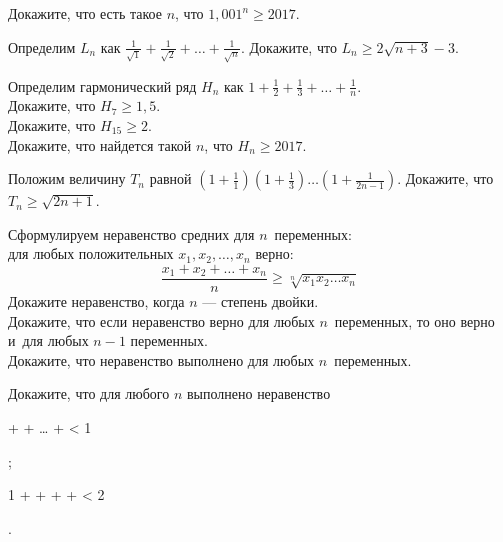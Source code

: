 



\begin{problems}

\item
Докажите, что есть такое $n$, что $1{,}001^{n} \geq 2017$.

\item
Определим $L_{n}$ как 
\(
    \frac{1}{\sqrt{1}} + \frac{1}{\sqrt{2}} + \ldots + \frac{1}{\sqrt{n}}
\).
Докажите, что $L_{n} \geq 2 \sqrt{n + 3} - 3$. 

\item
Определим гармонический ряд $H_{n}$ как 
\(
    1 + \frac{1}{2} + \frac{1}{3} + \ldots + \frac{1}{n}
\).
\\
\subproblem
Докажите, что $H_{7} \geq 1{,}5$.
\\
\subproblem
Докажите, что $H_{15} \geq 2$.
\\
\subproblem
Докажите, что найдется такой $n$, что $H_{n} \geq 2017$.

\item
Положим величину $T_{n}$ равной
\(
    \left( 1 + \frac{1}{1} \right)
    \left( 1 + \frac{1}{3} \right)
    \ldots
    \left( 1 + \frac{1}{2n - 1} \right)
\).
Докажите, что $T_{n} \geq \sqrt{2 n + 1}$.

\item
Сформулируем неравенство средних для $n$~переменных:\\
для любых положительных $x_1, x_2, \ldots, x_n$ верно:
\[
    \frac{x_{1} + x_{2} + \ldots + x_{n}}{n}
\geq
    \sqrt[n]{x_{1} x_{2} \ldots x_{n}}
\]
\subproblem
Докажите неравенство, когда $n$ --- степень двойки.
\\
\subproblem
Докажите, что если неравенство верно для любых $n$~переменных, то оно верно
и~для любых $n - 1$ переменных.
\\
\subproblem
Докажите, что неравенство выполнено для любых $n$~переменных.

\item
Докажите, что для любого $n$ выполнено неравенство
\begin{subproblemeq}
     +  + \ldots
    + 
<
    1
\end{subproblemeq};
\begin{subproblemeq}
    1 +  +  + \cdots + 
<
    2
\end{subproblemeq}.

\end{problems}

